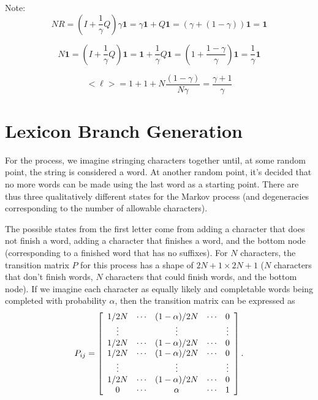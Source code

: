 \documentclass[11pt]{article}
\begin{document}
Note:
\begin{equation}
NR = (I + \frac{1}{\gamma}Q)\gamma\mathbf{1} = \gamma \mathbf{1} + Q\mathbf{1} = (\gamma + (1-\gamma))\mathbf{1} = \mathbf{1}
\end{equation}

\begin{equation}
N\mathbf{1} = (I + \frac{1}{\gamma}Q)\mathbf{1} = \mathbf{1} + \frac{1}{\gamma}Q\mathbf{1} = (1 + \frac{1-\gamma}{\gamma})\mathbf{1} = \frac{1}{\gamma}\mathbf{1}
\end{equation}


\begin{equation}
<\ell> = 1 + 1 + N\frac{(1-\gamma)}{N\gamma} = \frac{\gamma +1}{\gamma}
\end{equation}



\section{Lexicon Branch Generation}
For the process, we imagine stringing characters together until, at some random point, the string is considered a word. At another random point, it's decided that no more words can be made using the last word as a starting point. There are thus three qualitatively different states for the Markov process (and degeneracies corresponding to the number of allowable characters). 

The possible states from the first letter come from adding a character that does not finish a word, adding a character that finishes a word, and the bottom node (corresponding to a finished word that has no suffixes). For $N$ characters, the transition matrix $P$ for this process has a shape of $2N+1\times2N+1$ ($N$ characters that don't finish words, $N$ characters that could finish words, and the bottom node). If we imagine each character as equally likely and completable words being completed with probability $\alpha$, then the transition matrix can be expressed as
\begin{equation}
P_{ij}=\left[\begin{array}{c c c c c c}
1/2N&\cdots & (1-\alpha)/2N & \cdots & 0\\
 \vdots & & \vdots & & \vdots\\
1/2N & \cdots & (1-\alpha)/2N & \cdots & 0\\
1/2N & \cdots & (1-\alpha)/2N & \cdots & 0\\
\vdots & & \vdots & & \vdots\\
1/2N & \cdots & (1-\alpha)/2N & \cdots & 0\\
0 & \cdots & \alpha & \cdots & 1
\end{array}
\right].
\end{equation}
\end{document}
